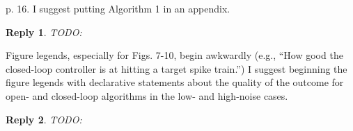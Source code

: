 \documentclass{article}
\newtheorem*{rep}{Reply}
\begin{document}
p. 16.  I suggest putting Algorithm 1 in an appendix. 

\begin{rep} TODO: \end{rep}

Figure legends, especially for Figs. 7-10, begin awkwardly (e.g., “How good the
closed-loop controller is at hitting a target spike train.”)  I suggest
beginning the figure legends with declarative statements about the quality of
the outcome for open- and closed-loop algorithms in the low- and high-noise
cases.


\begin{rep} TODO: \end{rep}



 

% 
% 
\end{document}
